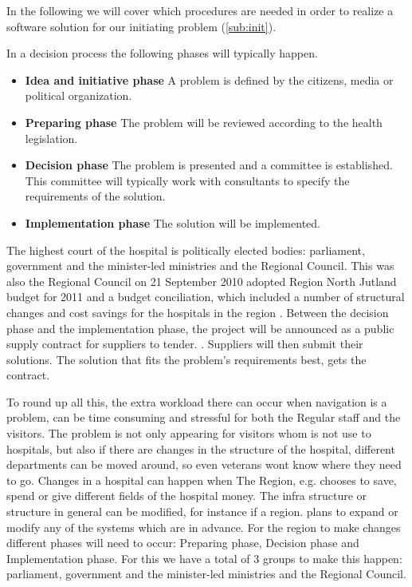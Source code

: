 In the following we will cover which procedures are needed in order to realize a software solution for our initiating problem (\cref{sub:init}).

In a decision process the following phases will typically happen. \cite{Sjaelland}


\begin{itemize}
  \setlength{\itemsep}{1pt}
  \setlength{\parskip}{0pt}
  \setlength{\parsep}{0pt}
	\item \textbf{Idea and initiative phase} A problem is defined by the citizens, media or political organization.
	\item \textbf{Preparing phase} The problem will be reviewed according to the health legislation.
	\item \textbf{Decision phase} The problem is presented and a committee is established. This committee will typically work with consultants to specify the requirements of the solution.
	\item \textbf{Implementation phase} The solution will be implemented. 
\end{itemize}

The highest court of the hospital is politically elected bodies: parliament, government and the minister-led ministries and the Regional Council. This was also the Regional Council on 21 September 2010 adopted Region North Jutland budget for 2011 and a budget conciliation, which included a number of structural changes and cost savings for the hospitals in the region \cite{politisk_styret_ca}. Between the decision phase and the implementation phase, the project will be announced as a public supply contract for suppliers to tender. \cite{Union2004}. Suppliers will then submit their solutions. The solution that fits the problem's requirements best, gets the contract. 

To round up all this, the extra workload there can occur when navigation is a problem, can be time consuming and stressful for both the Regular staff and the visitors. The problem is not only appearing for visitors whom is not use to hospitals, but also if there are changes in the structure of the hospital, different departments can be moved around, so even veterans wont know where they need to go. Changes in a hospital can happen when The Region, e.g. chooses to save, spend or give different fields of the hospital money. The infra structure or structure in general can be modified, for instance if a region. plans to expand or modify any of the systems which are in advance. For the region to make changes different phases will need to occur: Preparing phase, Decision phase and Implementation phase. For this we have a total of 3 groups to make this happen: parliament, government and the minister-led ministries and the Regional Council.